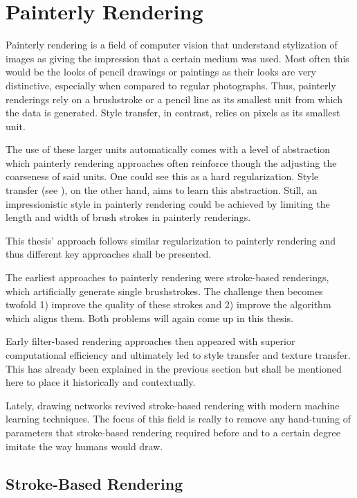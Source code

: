 \section{Painterly Rendering}


Painterly rendering is a field of computer vision that understand stylization of images as giving the impression that a certain medium was used.
Most often this would be the looks of pencil drawings or paintings as their looks are very distinctive, especially when compared to regular photographs.
Thus, painterly renderings rely on a brushstroke or a pencil line as its smallest unit from which the data is generated.
Style transfer, in contrast, relies on pixels as its smallest unit.

The use of these larger units automatically comes with a level of abstraction which painterly rendering approaches often reinforce though the adjusting the coarseness of said units.
One could see this as a hard regularization.
Style transfer (see ), on the other hand, aims to learn this abstraction.
Still, an impressionistic style in painterly rendering could be achieved by limiting the length and width of brush strokes in painterly renderings.

This thesis' approach follows similar regularization to painterly rendering and thus different key approaches shall be presented.

The earliest approaches to painterly rendering were stroke-based renderings, which artificially generate single brushstrokes.
The challenge then becomes twofold 1) improve the quality of these strokes and 2) improve the algorithm which aligns them.
Both problems will again come up in this thesis.

Early filter-based rendering approaches then appeared with superior computational efficiency and ultimately led to style transfer and texture transfer.
This has already been explained in the previous section but shall be mentioned here to place it historically and contextually.

Lately, drawing networks revived stroke-based rendering with modern machine learning techniques.
The focus of this field is really to remove any hand-tuning of parameters that stroke-based rendering required before and to a certain degree imitate the way humans would draw.


\subsection{Stroke-Based Rendering}

